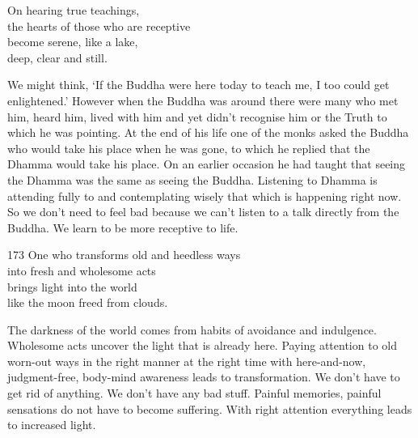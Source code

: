 
\begin{dhpVerse}{82}
\label{dhp-82}
On hearing true teachings,\\
the hearts of those who are receptive\\
become serene, like a lake,\\
deep, clear and still.
\end{dhpVerse}

\begin{dhpRefl}

We might think, `If the Buddha were here today to teach me, I too
could get enlightened.' However when the Buddha was around there were
many who met him, heard him, lived with him and yet didn't recognise
him or the Truth to which he was pointing. At the end of his life one
of the monks asked the Buddha who would take his place when he was
gone, to which he replied that the Dhamma would take his place. On an
earlier occasion he had taught that seeing the Dhamma was the same as
seeing the Buddha. Listening to Dhamma is attending fully to and
contemplating wisely that which is happening right now. So we don't
need to feel bad because we can't listen to a talk directly from the
Buddha. We learn to be more receptive to life.

\end{dhpRefl}


\begin{dhpVerse}{173}
\label{dhp-173}
One who transforms old and heedless ways\\
into fresh and wholesome acts\\
brings light into the world\\
like the moon freed from clouds.
\end{dhpVerse}

\begin{dhpRefl}

The darkness of the world comes from habits of avoidance and
indulgence. Wholesome acts uncover the light that is already here.
Paying attention to old worn-out ways in the right manner at the
right time with here-and-now, judgment-free, body-mind awareness
leads to transformation. We don't have to get rid of anything. We
don't have any bad stuff. Painful memories, painful sensations do not
have to become suffering. With right attention everything leads to
increased light.

\end{dhpRefl}

